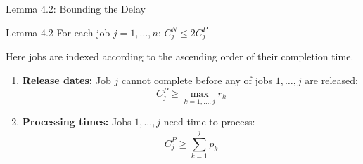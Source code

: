\documentclass[aspectratio=169, 12pt]{beamer}
\begin{document}
\begin{frame}{Lemma 4.2: Bounding the Delay}
    \begin{block}{Lemma 4.2}
        For each job $j = 1, \ldots, n$: \quad $C_j^N \leq 2C_j^P$ \\
    \end{block}
    Here jobs are indexed according to the ascending order of their completion time.

    \vspace{0.3cm}

    \begin{enumerate}
        \item<3-> \textbf{Release dates:} Job $j$ cannot complete before any of jobs $1, \ldots, j$ are released:
        $$C_j^P \geq \max_{k=1,\ldots,j} r_k$$
        
        \item<4-> \textbf{Processing times:} Jobs $1, \ldots, j$ need time to process:
        $$C_j^P \geq \sum_{k=1}^{j} p_k$$
    \end{enumerate}
\end{frame}


\end{document}
